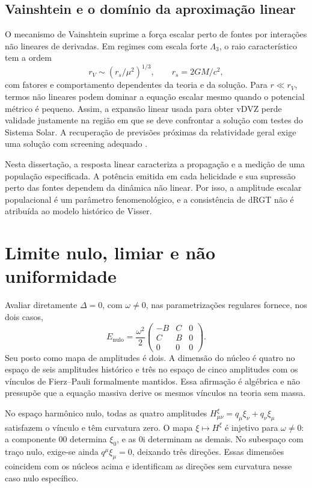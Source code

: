 \subsection{Vainshtein e o domínio da aproximação linear}

O mecanismo de Vainshtein suprime a força escalar perto de fontes por interações não lineares de derivadas. Em regimes com escala forte $\Lambda_3$, o raio característico tem a ordem
\begin{equation}
 r_V\sim(r_s/\mu^2)^{1/3},\qquad r_s=2GM/c^2,
\end{equation}
com fatores e comportamento dependentes da teoria e da solução. Para $r\ll r_V$, termos não lineares podem dominar a equação escalar mesmo quando o potencial métrico é pequeno. Assim, a expansão linear usada para obter vDVZ perde validade justamente na região em que se deve confrontar a solução com testes do Sistema Solar. A recuperação de previsões próximas da relatividade geral exige uma solução com screening adequado \autocite{babichev2013}.

Nesta dissertação, a resposta linear caracteriza a propagação e a medição de uma população especificada. A potência emitida em cada helicidade e sua supressão perto das fontes dependem da dinâmica não linear. Por isso, a amplitude escalar populacional é um parâmetro fenomenológico, e a consistência de dRGT não é atribuída ao modelo histórico de Visser.

\section{Limite nulo, limiar e não uniformidade}

Avaliar diretamente \(\Delta=0\), com \(\omega\ne0\), nas
parametrizações regulares fornece, nos dois casos,
\begin{equation}
 E_{\mathrm{nulo}}=\frac{\omega^2}{2}
 \begin{pmatrix}-B&C&0\\ C&B&0\\0&0&0\end{pmatrix}.
 \label{eq:fund-eletrica-nula}
\end{equation}
Seu posto como mapa de amplitudes é dois. A dimensão do núcleo é
quatro no espaço de seis amplitudes histórico e três no espaço de
cinco amplitudes com os vínculos de Fierz--Pauli formalmente mantidos.
Essa afirmação é algébrica e não pressupõe que a equação massiva
derive os mesmos vínculos na teoria sem massa.

No espaço harmônico nulo, todas as quatro amplitudes
\(H^\xi_{\mu\nu}=q_\mu\xi_\nu+q_\nu\xi_\mu\) satisfazem o
vínculo e têm curvatura zero. O mapa \(\xi\mapsto H^\xi\) é
injetivo para \(\omega\ne0\): a componente 00 determina
\(\xi_0\), e as 0i determinam as demais. No subespaço com traço
nulo, exige-se ainda \(q^\mu\xi_\mu=0\), deixando três
direções. Essas dimensões coincidem com os núcleos acima e identificam
as direções sem curvatura nesse caso nulo específico.

